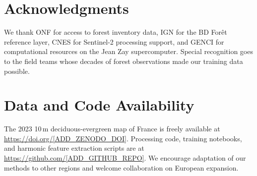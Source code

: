 \documentclass[utf8]{FrontiersinHarvard}
\begin{document}
\section*{Acknowledgments}
We thank ONF for access to forest inventory data, IGN for the BD Forêt reference layer, CNES for Sentinel-2 processing support, and GENCI for computational resources on the Jean Zay supercomputer. Special recognition goes to the field teams whose decades of forest observations made our training data possible.

\section*{Data and Code Availability}
The 2023 10\,m deciduous-evergreen map of France is freely available at \url{https://doi.org/[ADD_ZENODO_DOI]}. 
Processing code, training notebooks, and harmonic feature extraction scripts are at \url{https://github.com/[ADD_GITHUB_REPO]}.
We encourage adaptation of our methods to other regions and welcome collaboration on European expansion.



\end{document}
